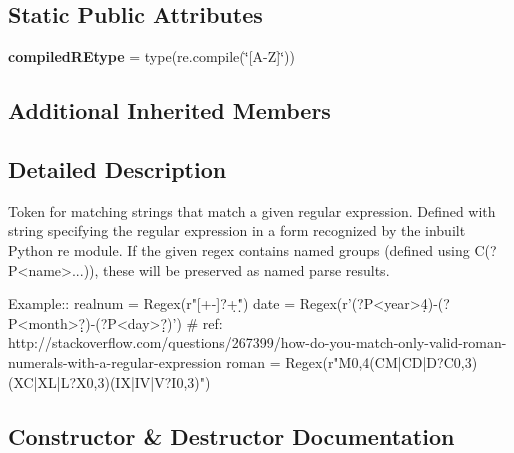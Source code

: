 \subsection*{Static Public Attributes}
\begin{DoxyCompactItemize}
\item 
\mbox{\label{classpkg__resources_1_1__vendor_1_1pyparsing_1_1_regex_acf52ddb23c1ec08f8c580c6e28c49bc5}} 
{\bfseries compiled\+R\+Etype} = type(re.\+compile(\char`\"{}\mbox{[}A-\/Z\mbox{]}\char`\"{}))
\end{DoxyCompactItemize}
\subsection*{Additional Inherited Members}


\subsection{Detailed Description}
\begin{DoxyVerb}Token for matching strings that match a given regular expression.
Defined with string specifying the regular expression in a form recognized by the inbuilt Python re module.
If the given regex contains named groups (defined using C{(?P<name>...)}), these will be preserved as 
named parse results.

Example::
    realnum = Regex(r"[+-]?\d+\.\d*")
    date = Regex(r'(?P<year>\d{4})-(?P<month>\d\d?)-(?P<day>\d\d?)')
    # ref: http://stackoverflow.com/questions/267399/how-do-you-match-only-valid-roman-numerals-with-a-regular-expression
    roman = Regex(r"M{0,4}(CM|CD|D?C{0,3})(XC|XL|L?X{0,3})(IX|IV|V?I{0,3})")
\end{DoxyVerb}
 

\subsection{Constructor \& Destructor Documentation}
\mbox{\label{classpkg__resources_1_1__vendor_1_1pyparsing_1_1_regex_a344d143fdcdc1ff4aef98404422781f1}} 
